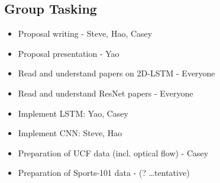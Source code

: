 \subsection*{Group Tasking}
\begin{itemize}
\item Proposal writing - Steve, Hao, Casey
\item Proposal presentation - Yao
\item Read and understand papers on 2D-LSTM - Everyone
\item Read and understand ResNet papers - Everyone
\item Implement LSTM: Yao, Casey
\item Implement CNN: Steve, Hao
\item Preparation of UCF data (incl. optical flow) - Casey
\item Preparation of Sports-101 data - (? \dots tentative)
\end{itemize}
